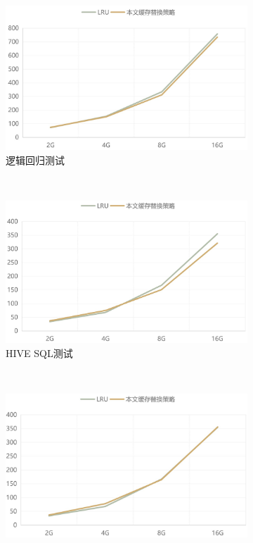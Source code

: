 \begin{figure}[!htbp]
    \centering
    \begin{subfigure}[b]{0.45\linewidth}
      \includegraphics[width=\textwidth]{Img/lr-cache.jpg}
      \caption{逻辑回归测试}
      \label{fig:lr-cache}
    \end{subfigure}%
    ~%
    \begin{subfigure}[b]{0.45\linewidth}
      \includegraphics[width=\textwidth]{Img/hive-cache.jpg}
      \caption{HIVE SQL测试}
      \label{fig:hive-cache}
    \end{subfigure}
    \\%
    \begin{subfigure}[b]{0.45\linewidth}
      \includegraphics[width=\textwidth]{Img/pagerank-cache.jpg}

\end{subfigure}
\end{figure}
